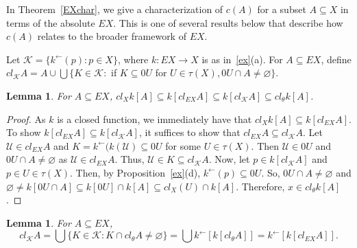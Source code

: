 \documentclass[11pt]{amsart}
\newif\ifdraft\draftfalse
\newtheorem{lemma}[theorem]{Lemma}
\theoremstyle{definition}
\theoremstyle{remark}
\numberwithin{equation}{section}
\begin{document}
In Theorem~\ref{EXchar}, we give a characterization of $c(A)$ for a subset $A{\subseteq} X$ in terms of the absolute $EX$. This is one of several results below that describe how $c(A)$ relates to the broader framework of $EX$.

Let ${\ensuremath{\mathcal{K}}} =\{k^{\leftarrow}(p): p \in X\}$, where $k:EX\to X$ is as in~\ref{ex}(a). For $A \subseteq EX$, define $cl_{{\ensuremath{\mathcal{K}}}}A = A \cup \bigcup\{K \in {\ensuremath{\mathcal{K}}}:$ if $K \subseteq 0U$ for  $U \in \tau(X), 0U \cap A \ne \varnothing \}$. 

\begin{lemma}{{\immediate{}}{\ifdraft\hspace{-\lastskip}\vadjust{\vspace{-1mm}\smash{\llap{{\tt {{closures}}}\hspace{8mm}}}\vspace{1mm}}\fi}}
For $A \subseteq EX$, $cl_Xk[A] \subseteq k[cl_{EX}A] \subseteq k[cl_{{\ensuremath{\mathcal{K}}}}A] \subseteq cl_{\theta}k[A]$.
\end{lemma}

\begin{proof} As $k$ is a closed function, we immediately have that $cl_Xk[A] \subseteq k[cl_{EX}A]$. To show $k[cl_{EX}A] \subseteq k[cl_{{\ensuremath{\mathcal{K}}}}A]$, it suffices to show that  $cl_{EX}A \subseteq cl_{{\ensuremath{\mathcal{K}}}}A$.  Let ${\ensuremath{\mathcal{U}}} \in cl_{EX}A$ and $K = k^{\leftarrow}(k({\ensuremath{\mathcal{U}}}) \subseteq 0U$ for some  $U \in \tau(X)$.  Then ${\ensuremath{\mathcal{U}}} \in 0U$ and $0U \cap A \ne \varnothing$ as ${\ensuremath{\mathcal{U}}} \in cl_{EX}A$.  Thus, ${\ensuremath{\mathcal{U}}} \in K \subseteq cl_{{\ensuremath{\mathcal{K}}}}A$.
 \newline Now, let $p \in k[cl_{{\ensuremath{\mathcal{K}}}}A]$ and $p \in U  \in \tau(X)$.  Then, by Proposition~\ref{ex}(d), $ k^{\leftarrow}(p) \subseteq 0U$.  So, $0U \cap A \ne \varnothing$ and $\varnothing \ne k[0U \cap A] \subseteq k[0U] \cap k[A] \subseteq cl_X(U) \cap k[A]$. Therefore, $x \in cl_{\theta}k[A]$. 
\end{proof}

\begin{lemma}{{\immediate{}}{\ifdraft\hspace{-\lastskip}\vadjust{\vspace{-1mm}\smash{\llap{{\tt {{clKchar}}}\hspace{8mm}}}\vspace{1mm}}\fi}}
For $A{\subseteq} EX$, 
$$cl_{{\ensuremath{\mathcal{{K}}}}}A={\bigcup}\{K\in{\ensuremath{\mathcal{{K}}}}:K{\cap} cl_\theta A\neq{\varnothing}\}={\bigcup} k^{\leftarrow}[k[cl_\theta A]]=k^{\leftarrow}[k[cl_{EX}A]].$$
\end{lemma}
\end{document}
